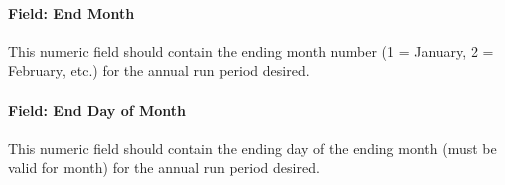 \documentclass[11pt]{article}
\begin{document}
\paragraph{Field: End Month}\label{field-end-month-hm}
This numeric field should contain the ending month number (1 = January, 2 = February, etc.) for the annual run period desired.

\paragraph{Field: End Day of Month}\label{field-end-day-of-month-hm}
This numeric field should contain the ending day of the ending month (must be valid for month) for the annual run period desired.
\end{document}

